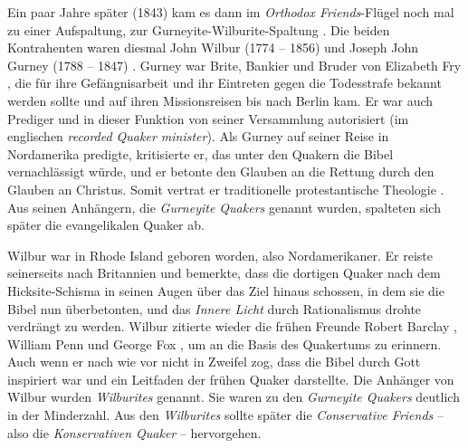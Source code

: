 Ein paar Jahre später (1843) kam es dann im \textit{Orthodox Friends}-Flügel
noch mal zu einer Aufspaltung, zur Gurneyite-Wilburite-Spaltung
. Die beiden
Kontrahenten waren diesmal John Wilbur (1774 -- 1856)  und Joseph John Gurney
(1788 -- 1847) . Gurney war Brite, Bankier
 und Bruder von Elizabeth Fry , die für
ihre Gefängnisarbeit  und ihr Eintreten gegen
die Todesstrafe  bekannt werden
sollte und auf ihren Missionsreisen bis nach Berlin kam.
Er war auch Prediger  und in dieser Funktion
von seiner
Versammlung autorisiert (im englischen \textit{recorded Quaker minister}). Als
Gurney auf seiner Reise in Nordamerika predigte, kritisierte er, das unter den
Quakern die Bibel  vernachlässigt würde, und er betonte den Glauben
an die
Rettung durch den Glauben an Christus. Somit vertrat er traditionelle
protestantische Theologie . Aus seinen
Anhängern, die \textit{Gurneyite Quakers}
genannt wurden, spalteten sich später die evangelikalen Quaker
 ab.

\medskip

Wilbur war in Rhode Island  geboren worden, also
Nordamerikaner. Er reiste seinerseits
nach Britannien und bemerkte, dass die dortigen Quaker nach dem Hicksite-Schisma
in seinen Augen über das Ziel hinaus schossen, in dem sie die Bibel nun
überbetonten, und das \textit{Innere Licht} durch Rationalismus drohte verdrängt
zu werden. Wilbur zitierte wieder die frühen Freunde Robert Barclay
, William
Penn  und George Fox , um an die Basis des Quakertums zu erinnern. Auch wenn er
nach wie vor nicht in Zweifel zog, dass die Bibel durch Gott inspiriert war und
ein Leitfaden der frühen Quaker darstellte. Die Anhänger von Wilbur wurden
\textit{Wilburites} genannt. Sie waren zu den
\textit{Gurneyite Quakers} deutlich in der Minderzahl.
Aus den \textit{Wilburites} sollte später die
\textit{Conservative Friends}  -- also die
\textit{Konservativen Quaker} --
hervorgehen.

\medskip

